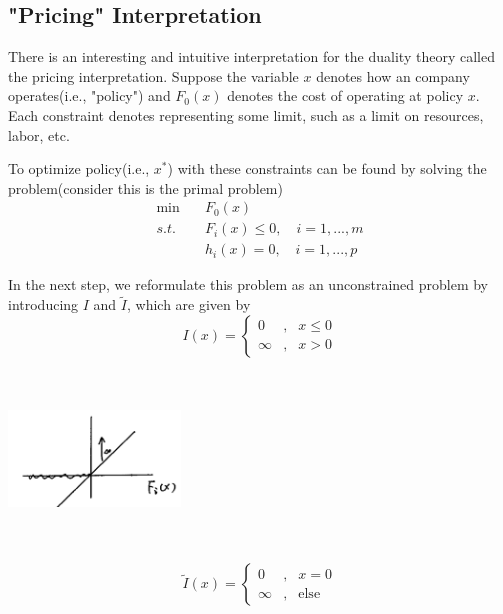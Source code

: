 \vspace{0.3cm}
\subsection{"Pricing" Interpretation}
There is an interesting and intuitive interpretation for the duality theory called the pricing interpretation. Suppose the variable $x$ denotes how an company operates(i.e., "policy") and $F_0(x)$ denotes the cost of operating at policy $x$. Each constraint denotes representing some limit, such as a limit on resources, labor, etc. 

To optimize policy(i.e., $x^*$) with these constraints can be found by solving the problem(consider this is the primal problem)
\begin{align*}
	\min \quad & F_0(x)\\
	s.t.\quad & F_i(x) \leq 0,\quad i = 1,...,m\\
	& h_i(x) = 0,\quad i = 1,...,p
\end{align*}

In the next step, we reformulate this problem as an unconstrained problem by introducing $I$ and $\tilde{I}$, which are given by
\begin{equation}
I(x)=\left\{
\begin{aligned}
0 & , & x\leq 0 \\
\infty & , & x>0
\end{aligned}
\right.
\end{equation}

\begin{marginfigure}
	\centering
	\includegraphics[width=1.8in,height=1.8in]{figures/ch10/figure1127_2.png}
\end{marginfigure}

\begin{equation}
\tilde{I}(x)=\left\{
\begin{aligned}
0 & , & x= 0 \\
\infty & , & \text{else}
\end{aligned}
\right.
\end{equation}



